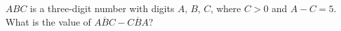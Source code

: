 $ABC$ is a three-digit number with digits $A$, $B$, $C$, where $C>0$ and $A-C=5$. What is the value of $\overline{ABC}-\overline{CBA}$?
